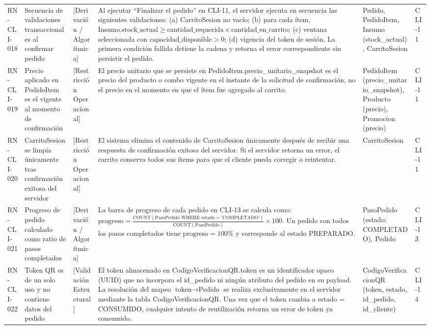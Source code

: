 \begin{landscape}
\begin{longtable}[c]{l p{2.1cm} p{2.1cm} p{8cm} p{4cm} p{3cm}}
RN-CLI-018 & Secuencia de validaciones transaccionales al confirmar pedido & [Derivación / Algorítmica] & Al ejecutar ``Finalizar el pedido'' en CLI-11, el servidor ejecuta en secuencia las siguientes validaciones: (a) CarritoSesion no vacío; (b) para cada ítem, $\text{Insumo.stock\_actual} \ge \text{cantidad\_requerida} \times \text{cantidad\_en\_carrito}$; (c) ventana seleccionada con $\text{capacidad\_disponible} > 0$; (d) vigencia del token de sesión. La primera condición fallida detiene la cadena y retorna el error correspondiente sin persistir el pedido. & Pedido, PedidoItem, Insumo (stock\_actual), CarritoSesion & CLI-11 \\
\addlinespace
RN-CLI-019 & Precio aplicado en PedidoItem es el vigente al momento de confirmación & [Restricción Operacional] & El precio unitario que se persiste en PedidoItem.precio\_unitario\_snapshot es el precio del producto o combo vigente en el instante de la solicitud de confirmación, no el precio en el momento en que el ítem fue agregado al carrito. & PedidoItem (precio\_unitario\_snapshot), Producto (precio), Promocion (precio) & CLI-11 \\
\addlinespace
RN-CLI-020 & CarritoSesion se limpia únicamente tras confirmación exitosa del servidor & [Restricción Operacional] & El sistema elimina el contenido de CarritoSesion únicamente después de recibir una respuesta de confirmación exitosa del servidor. Si el servidor retorna un error, el carrito conserva todos sus ítems para que el cliente pueda corregir o reintentar. & CarritoSesion & CLI-11 \\
\addlinespace
RN-CLI-021 & Progreso de pedido calculado como ratio de pasos completados & [Derivación / Algorítmica] & La barra de progreso de cada pedido en CLI-13 se calcula como: $\text{progreso} = \frac{\text{COUNT}(\text{PasoPedido WHERE } \text{estado} = \text{'COMPLETADO'})}{\text{COUNT}(\text{PasoPedido})} \times 100$. Un pedido con todos los pasos completados tiene $\text{progreso} = 100\%$ y corresponde al estado PREPARADO. & PasoPedido (estado: COMPLETADO), Pedido & CLI-13 \\
\addlinespace
RN-CLI-022 & Token QR es de un solo uso y no contiene datos del pedido & [Validación Estructural] & El token almacenado en CodigoVerificacionQR.token es un identificador opaco (UUID) que no incorpora el id\_pedido ni ningún atributo del pedido en su payload. La resolución del mapeo $\text{token} \rightarrow \text{Pedido}$ se realiza exclusivamente en el servidor mediante la tabla CodigoVerificacionQR. Una vez que el token cambia a estado = CONSUMIDO, cualquier intento de reutilización retorna un error de token ya consumido. & CodigoVerificacionQR (token, estado, id\_pedido, id\_cliente) & CLI-14 \\
\end{longtable}
\endgroup


\end{landscape}
